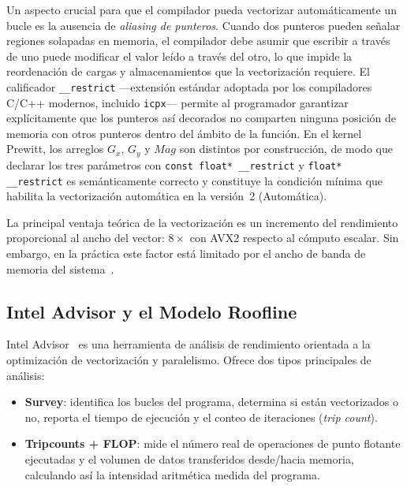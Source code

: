 Un aspecto crucial para que el compilador pueda vectorizar
autom\'aticamente un bucle es la ausencia de \textit{aliasing de
punteros}.
Cuando dos punteros pueden se\~nalar regiones solapadas en memoria,
el compilador debe asumir que escribir a trav\'es de uno puede
modificar el valor le\'ido a trav\'es del otro, lo que impide la
reordenaci\'on de cargas y almacenamientos que la vectorizaci\'on
requiere.
El calificador \texttt{\_\_restrict} —extensi\'on est\'andar
adoptada por los compiladores C/C++ modernos, incluido
\texttt{icpx}--- permite al programador garantizar expl\'icitamente
que los punteros as\'i decorados no comparten ninguna posici\'on
de memoria con otros punteros dentro del \'ambito de la funci\'on.
En el kernel Prewitt, los arreglos $G_x$, $G_y$ y $\textit{Mag}$
son distintos por construcci\'on, de modo que declarar los tres
par\'ametros con \texttt{const float* \_\_restrict} y
\texttt{float* \_\_restrict} es sem\'anticamente correcto y
constituye la condici\'on m\'inima que habilita la vectorizaci\'on
autom\'atica en la versi\'on~2 (Autom\'atica).

La principal ventaja te\'orica de la vectorizaci\'on es un
incremento del rendimiento proporcional al ancho del vector:
$8\times$ con AVX2 respecto al c\'omputo escalar.
Sin embargo, en la pr\'actica este factor est\'a limitado por
el ancho de banda de memoria del sistema~\cite{sutter2005}.

\subsection{Intel Advisor y el Modelo Roofline}

Intel Advisor~\cite{intel_advisor} es una herramienta de an\'alisis
de rendimiento orientada a la optimizaci\'on de vectorizaci\'on
y paralelismo.
Ofrece dos tipos principales de an\'alisis:

\begin{itemize}
  \item \textbf{Survey}: identifica los bucles del programa,
    determina si est\'an vectorizados o no, reporta el tiempo de
    ejecuci\'on y el conteo de iteraciones (\textit{trip count}).

  \item \textbf{Tripcounts + FLOP}: mide el n\'umero real de
    operaciones de punto flotante ejecutadas y el volumen de
    datos transferidos desde/hacia memoria, calculando as\'i la
    intensidad aritm\'etica medida del programa.
\end{itemize}

